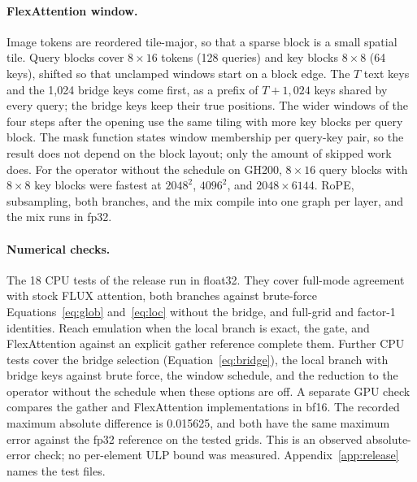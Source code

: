 \paragraph{FlexAttention window.} Image tokens are reordered tile-major, so that a sparse block is a small spatial tile. Query blocks cover $8\times16$ tokens (128 queries) and key blocks $8\times8$ (64 keys), shifted so that unclamped windows start on a block edge. The $T$ text keys and the 1,024 bridge keys come first, as a prefix of $T+1{,}024$ keys shared by every query; the bridge keys keep their true positions. The wider windows of the four steps after the opening use the same tiling with more key blocks per query block. The mask function states window membership per query-key pair, so the result does not depend on the block layout; only the amount of skipped work does. For the operator without the schedule on GH200, $8\times16$ query blocks with $8\times8$ key blocks were fastest at $2048^2$, $4096^2$, and $2048\times6144$. RoPE, subsampling, both branches, and the mix compile into one graph per layer, and the mix runs in fp32.

\paragraph{Numerical checks.} The 18 CPU tests of the release run in float32. They cover full-mode agreement with stock FLUX attention, both branches against brute-force Equations~\ref{eq:glob} and~\ref{eq:loc} without the bridge, and full-grid and factor-1 identities. Reach emulation when the local branch is exact, the gate, and FlexAttention against an explicit gather reference complete them. Further CPU tests cover the bridge selection (Equation~\ref{eq:bridge}), the local branch with bridge keys against brute force, the window schedule, and the reduction to the operator without the schedule when these options are off. A separate GPU check compares the gather and FlexAttention implementations in bf16. The recorded maximum absolute difference is 0.015625, and both have the same maximum error against the fp32 reference on the tested grids. This is an observed absolute-error check; no per-element ULP bound was measured. Appendix~\ref{app:release} names the test files.

